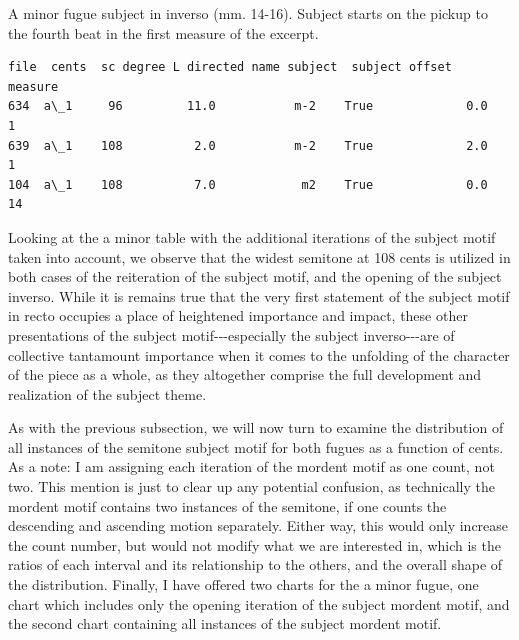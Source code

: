 \begin{Example}[H]
    \begin{center}
    \caption[A minor fugue subject in inverso (mm. 14-16). ]{ A minor fugue subject in inverso (mm. 14-16). Subject starts on the pickup to the fourth beat in the first measure of the excerpt.}
    \end{center}
\end{Example}
    
\begin{Verbatim}[commandchars=\\\{\}]
    file  cents  sc degree L directed name subject  subject offset  measure
634  a\_1     96         11.0           m-2    True             0.0        1
639  a\_1    108          2.0           m-2    True             2.0        1
104  a\_1    108          7.0            m2    True             0.0       14
\end{Verbatim}
    Looking at the a minor table with the additional iterations of the
subject motif taken into account, we observe that the widest semitone at
108 cents is utilized in both cases of the reiteration of the subject
motif, and the opening of the subject inverso. While it is remains true
that the very first statement of the subject motif in recto occupies a
place of heightened importance and impact, these other presentations of
the subject motif-\/-\/-especially the subject inverso-\/-\/-are of
collective tantamount importance when it comes to the unfolding of the
character of the piece as a whole, as they altogether comprise the full
development and realization of the subject theme.

As with the previous subsection, we will now turn to examine the
distribution of all instances of the semitone subject motif for both
fugues as a function of cents. As a note: I am assigning each iteration
of the mordent motif as one count, not two. This mention is just to
clear up any potential confusion, as technically the mordent motif
contains two instances of the semitone, if one counts the descending and
ascending motion separately. Either way, this would only increase the
count number, but would not modify what we are interested in, which is
the ratios of each interval and its relationship to the others, and the
overall shape of the distribution. Finally, I have offered two charts
for the a minor fugue, one chart which includes only the opening
iteration of the subject mordent motif, and the second chart containing
all instances of the subject mordent motif.




